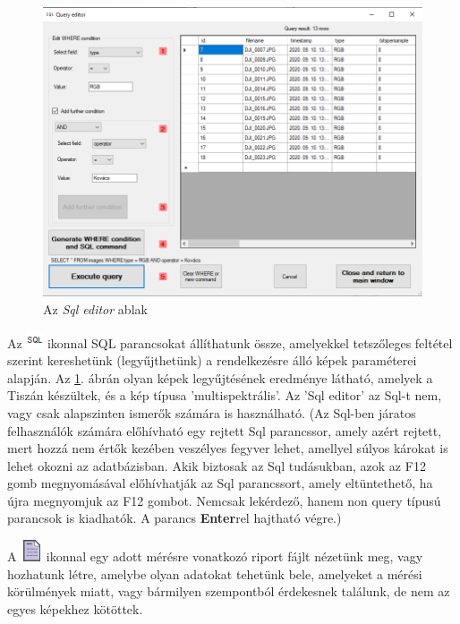 \documentclass[a4paper,12pt]{article}
\begin{document}
\begin{figure}
	\centering
	\includegraphics[width=12cm]{sqleditor.png}
	\caption{Az \textit{Sql editor} ablak}
	\label{fig:sqleditor}
\end{figure}

Az \includegraphics[width=0.5cm]{sql.png} ikonnal SQL parancsokat állíthatunk össze, amelyekkel tetszőleges feltétel szerint kereshetünk (legyűjthetünk) a rendelkezésre álló képek paraméterei alapján. Az \ref{fig:sqleditor}. ábrán olyan képek legyűjtésének eredménye látható, amelyek a Tiszán készültek, és a kép típusa 'multispektrális'. Az 'Sql editor' az Sql-t nem, vagy csak alapszinten ismerők számára is használható. 
(Az Sql-ben járatos felhasználók számára előhívható egy rejtett Sql parancssor, amely azért rejtett, mert hozzá nem értők kezében veszélyes fegyver lehet, amellyel súlyos károkat is lehet okozni az adatbázisban. Akik biztosak az Sql tudásukban, azok az F12 gomb megnyomásával előhívhatják az Sql parancssort, amely eltüntethető, ha újra megnyomjuk az F12 gombot. Nemcsak lekérdező, hanem non query típusú parancsok is kiadhatók. A parancs \textbf{Enter}rel hajtható végre.)


A \includegraphics[width = 0.5 cm]{sheet.png} ikonnal egy adott mérésre vonatkozó riport fájlt nézetünk meg, vagy hozhatunk létre, amelybe olyan adatokat tehetünk bele, amelyeket a mérési körülmények miatt, vagy bármilyen szempontból érdekesnek találunk, de nem az egyes képekhez kötöttek.
\end{document}
